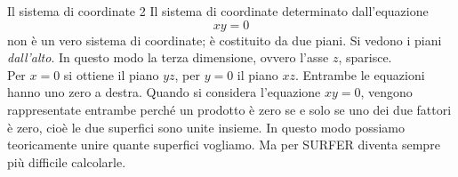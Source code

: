 \begin{surferPage}[Coordinate 2]{Il sistema di coordinate 2}
Il sistema di coordinate determinato dall'equazione
\[xy=0\]
non \`e un vero sistema di coordinate; \`e costituito da due piani. Si vedono i piani {\it dall'alto}. In questo modo la terza dimensione, ovvero l'asse $z$, sparisce.\\
Per $x=0$ si ottiene il piano $yz$, per $y=0$ il piano $xz$.
Entrambe le equazioni hanno uno zero a destra. Quando si considera l'equazione $xy=0$, vengono rappresentate entrambe perch\'e un prodotto \`e zero se e solo se uno dei due fattori \`e zero, cio\`e le due superfici sono unite insieme. In questo modo possiamo teoricamente unire quante superfici vogliamo. Ma per SURFER diventa sempre pi\`u difficile calcolarle.
\end{surferPage}

